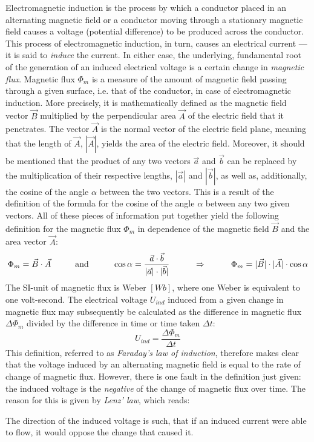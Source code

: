 Electromagnetic induction is the process by which a conductor placed in an alternating magnetic field or a conductor moving through a stationary magnetic field causes a voltage (potential difference) to be produced across the conductor. This process of electromagnetic induction, in turn, causes an electrical current --- it is said to \emph{induce} the current. In either case, the underlying, fundamental root of the generation of an induced electrical voltage is a certain change in \emph{magnetic flux}. Magnetic flux $\Phi_m$ is a measure of the amount of magnetic field passing through a given surface, i.e. that of the conductor, in case of electromagnetic induction. More precisely, it is mathematically defined as the magnetic field vector $\vec{B}$ multiplied by the perpendicular area $\vec{A}$ of the electric field that it penetrates. The vector $\vec{A}$ is the normal vector of the electric field plane, meaning that the length of $\vec{A}$, $|\vec{A}|$, yields the area of the electric field. Moreover, it should be mentioned that the product of any two vectors $\vec{a}$ and $\vec{b}$ can be replaced by the multiplication of their respective lengths, $|\vec{a}|$ and $|\vec{b}|$, as well as, additionally, the cosine of the angle $\alpha$ between the two vectors. This is a result of the definition of the formula for the cosine of the angle $\alpha$ between any two given vectors. All of these pieces of information put together yield the following definition for the magnetic flux $\Phi_m$ in dependence of the magnetic field $\vec{B}$ and the area vector $\vec{A}$: $$\Phi_m = \vec{B} \cdot \vec{A} \hspace{1 cm} \text{and} \hspace{1 cm} \cos \alpha = \frac{\vec{a} \cdot \vec{b}}{|\vec{a}| \cdot |\vec{b}|} \hspace{1 cm} \Rightarrow \hspace{1 cm} \Phi_m = |\vec{B}| \cdot |\vec{A}| \cdot \cos \alpha$$ The SI-unit of magnetic flux is Weber $[Wb]$, where one Weber is equivalent to one volt-second. The electrical voltage $U_{ind}$ induced from a given change in magnetic flux may subsequently be calculated as the difference in magnetic flux $\Delta \Phi_m$ divided by the difference in time or time taken $\Delta t$: $$U_{ind} = \frac{\Delta \Phi_m}{\Delta t}$$ This definition, referred to as \emph{Faraday's law of induction}, therefore makes clear that the voltage induced by an alternating magnetic field is equal to the rate of change of magnetic flux. However, there is one fault in the definition just given: the induced voltage is the \emph{negative} of the change of magnetic flux over time. The reason for this is given by \emph{Lenz' law}, which reads:

\begin{displayquote}

	The direction of the induced voltage is such, that if an induced current were able to flow, it would oppose the change that caused it.

\end{displayquote}

